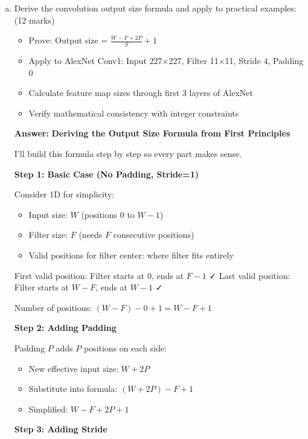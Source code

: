 \documentclass[12pt]{article}
\newcommand{\answer}[1]{{\color{answercolor}\textbf{Answer:} #1}}
\newcommand{\explanation}[1]{{\color{explanationcolor}#1}}
\begin{document}
\begin{enumerate}[(a)]
    \item Derive the convolution output size formula and apply to practical examples: \hfill (12 marks)
    \begin{itemize}
        \item Prove: Output size = $\frac{W - F + 2P}{S} + 1$
        \item Apply to AlexNet Conv1: Input 227×227, Filter 11×11, Stride 4, Padding 0
        \item Calculate feature map sizes through first 3 layers of AlexNet
        \item Verify mathematical consistency with integer constraints
    \end{itemize}
    
    \answer{
    \textbf{Deriving the Output Size Formula from First Principles}
    
    \explanation{
    I'll build this formula step by step so every part makes sense.
    
    \textbf{Step 1: Basic Case (No Padding, Stride=1)}
    
    Consider 1D for simplicity:
    \begin{itemize}
        \item Input size: $W$ (positions 0 to $W-1$)
        \item Filter size: $F$ (needs $F$ consecutive positions)
        \item Valid positions for filter center: where filter fits entirely
    \end{itemize}
    
    First valid position: Filter starts at 0, ends at $F-1$ ✓
    Last valid position: Filter starts at $W-F$, ends at $W-1$ ✓
    
    Number of positions: $(W-F) - 0 + 1 = W - F + 1$
    }
    
    \textbf{Step 2: Adding Padding}
    
    \explanation{
    Padding $P$ adds $P$ positions on each side:
    \begin{itemize}
        \item New effective input size: $W + 2P$
        \item Substitute into formula: $(W + 2P) - F + 1$
        \item Simplified: $W - F + 2P + 1$
    \end{itemize}
    }
    
    \textbf{Step 3: Adding Stride}
    
}
\end{enumerate}
\end{document}

